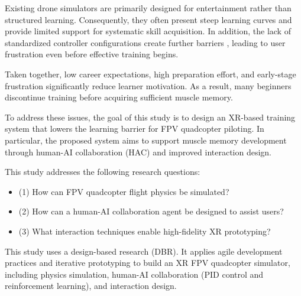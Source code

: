 Existing drone simulators are primarily designed for entertainment rather than structured learning. Consequently, they often present steep learning curves and provide limited support for systematic skill acquisition. In addition, the lack of standardized controller configurations create further barriers \parencite{ebeid_survey_2018}, leading to user frustration even before effective training begins.

Taken together, low career expectations, high preparation effort, and early-stage frustration significantly reduce learner motivation. As a result, many beginners discontinue training before acquiring sufficient muscle memory.

To address these issues, the goal of this study is to design an XR-based training system that lowers the learning barrier for FPV quadcopter piloting. In particular, the proposed system aims to support muscle memory development through human-AI collaboration (HAC) and improved interaction design.

This study addresses the following research questions:

\begin{itemize}
\item[] (1) How can FPV quadcopter flight physics be simulated?
\item[] (2) How can a human-AI collaboration agent be designed to assist users?
\item[] (3) What interaction techniques enable high-fidelity XR prototyping?
\end{itemize}

This study uses a design-based research (DBR). It applies agile development practices and iterative prototyping to build an XR FPV quadcopter simulator, including physics simulation, human-AI collaboration (PID control and reinforcement learning), and interaction design.